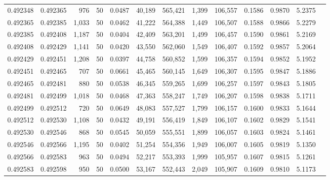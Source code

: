\begin{tabular}{rrrrrrrrrrrrr}
0.492348 & 0.492365 &   976 &  50 &                                     0.0487 &  40,189 & 565,421 &   1,399 & 106,557 & 0.1586 & 0.9870 & 5.2375 \\
0.492365 & 0.492385 & 1,033 &  50 &                                     0.0462 &  41,222 & 564,388 &   1,449 & 106,507 & 0.1588 & 0.9866 & 5.2279 \\
0.492385 & 0.492408 & 1,187 &  50 &                                     0.0404 &  42,409 & 563,201 &   1,499 & 106,457 & 0.1590 & 0.9861 & 5.2169 \\
0.492408 & 0.492429 & 1,141 &  50 &                                     0.0420 &  43,550 & 562,060 &   1,549 & 106,407 & 0.1592 & 0.9857 & 5.2064 \\
0.492429 & 0.492451 & 1,208 &  50 &                                     0.0397 &  44,758 & 560,852 &   1,599 & 106,357 & 0.1594 & 0.9852 & 5.1952 \\
0.492451 & 0.492465 &   707 &  50 &                                     0.0661 &  45,465 & 560,145 &   1,649 & 106,307 & 0.1595 & 0.9847 & 5.1886 \\
0.492465 & 0.492481 &   880 &  50 &                                     0.0538 &  46,345 & 559,265 &   1,699 & 106,257 & 0.1597 & 0.9843 & 5.1805 \\
0.492481 & 0.492499 & 1,018 &  50 &                                     0.0468 &  47,363 & 558,247 &   1,749 & 106,207 & 0.1598 & 0.9838 & 5.1711 \\
0.492499 & 0.492512 &   720 &  50 &                                     0.0649 &  48,083 & 557,527 &   1,799 & 106,157 & 0.1600 & 0.9833 & 5.1644 \\
0.492512 & 0.492530 & 1,108 &  50 &                                     0.0432 &  49,191 & 556,419 &   1,849 & 106,107 & 0.1602 & 0.9829 & 5.1541 \\
0.492530 & 0.492546 &   868 &  50 &                                     0.0545 &  50,059 & 555,551 &   1,899 & 106,057 & 0.1603 & 0.9824 & 5.1461 \\
0.492546 & 0.492566 & 1,195 &  50 &                                     0.0402 &  51,254 & 554,356 &   1,949 & 106,007 & 0.1605 & 0.9819 & 5.1350 \\
0.492566 & 0.492583 &   963 &  50 &                                     0.0494 &  52,217 & 553,393 &   1,999 & 105,957 & 0.1607 & 0.9815 & 5.1261 \\
0.492583 & 0.492598 &   950 &  50 &                                     0.0500 &  53,167 & 552,443 &   2,049 & 105,907 & 0.1609 & 0.9810 & 5.1173 \\

\end{tabular}
